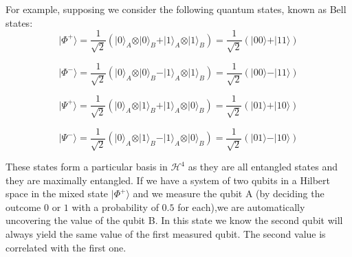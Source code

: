 For example, supposing we consider the following quantum states, known as Bell states:
\begin{equation}
\vert\Phi^{+}\rangle=\frac{1}{\sqrt{2}}(\vert0\rangle_{A} \otimes\vert0\rangle_{B} +\vert1\rangle_{A} \otimes\vert1\rangle_{B})=\frac{1}{\sqrt{2}}(\vert00\rangle+\vert11\rangle)
\end{equation}

\begin{equation}
\vert\Phi^{-}\rangle=\frac{1}{\sqrt{2}}(\vert0\rangle_{A} \otimes\vert0\rangle_{B} -\vert1\rangle_{A} \otimes\vert1\rangle_{B})=\frac{1}{\sqrt{2}}(\vert00\rangle-\vert11\rangle)
\end{equation}

\begin{equation}
\vert\Psi^{+}\rangle=\frac{1}{\sqrt{2}}(\vert0\rangle_{A} \otimes\vert1\rangle_{B} +\vert1\rangle_{A}\otimes\vert0\rangle_{B})=\frac{1}{\sqrt{2}}(\vert01\rangle+\vert10\rangle)
\end{equation}

\begin{equation}
\vert\Psi^{-}\rangle=\frac{1}{\sqrt{2}}(\vert0\rangle_{A} \otimes\vert1\rangle_{B} -\vert1\rangle_{A} \otimes\vert0\rangle_{B})=\frac{1}{\sqrt{2}}(\vert01\rangle-\vert10\rangle)
\end{equation}

These states form a particular basis in $\mathcal{H}^4$ as they are all entangled states and they are maximally entangled. If we have a system of two qubits in a Hilbert space in the mixed state $\vert\Phi^{+}\rangle$ and we measure the qubit A (by deciding the outcome $0$ or $1$ with a probability of $0.5$ for each),we are automatically uncovering the value of the qubit B. In this state we know the second qubit will always yield the same value of the first measured qubit. The second value is correlated with the first one.




